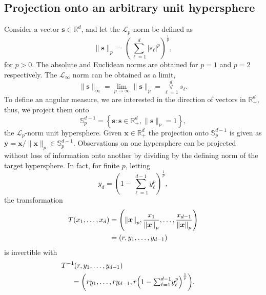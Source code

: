\subsection{Projection onto an arbitrary unit hypersphere\label{subsec:projection}}

Consider a vector $\bm{s} \in {\mathbb R}^d$, and let the $\mathcal{L}_p$-norm be defined as
  \begin{equation*}
    \lVert \bm{s} \rVert_p = \left({\textstyle\sum}_{\ell = 1}^d \lvert s_{\ell}\rvert^p\right)^{\frac{1}{p}},
  \end{equation*}
for $p>0$. The absolute and Euclidean norms are obtained for $p=1$ and $p=2$ respectively. 
The $\mathcal{L}_{\infty}$ norm can be obtained as a limit, 
  \begin{equation*}
    \lVert \bm{s} \rVert_{\infty}
      = \lim\limits_{p\to\infty} \lVert \bm{s} \rVert_p
      = \underset{\ell = 1}{\overset{d}{\vee}}s_{\ell}.
  \end{equation*}
To define an angular measure,  we are interested in the direction of
vectors in ${\mathbb R}_{+}^d$, thus, we project them onto
  \begin{equation*}
    {\mathbb S}_{p}^{d-1} = \left\lbrace \bm{s} : \bm{s} \in {\mathbb R}_{+}^{d}, \lVert \bm{s}\rVert_{p} = 1\right\rbrace,
  \end{equation*}
  the $\mathcal{L}_p$-norm unit hypersphere.
  Given $\bm{x}\in {\mathbb R}^d_+$ the projection onto ${\mathbb S}_{p}^{d-1}$ is given as
  $\bm{y} = \bm{x} / \lVert \bm{x}\rVert_p \in {\mathbb S}_{p}^{d-1}$.
  Observations on one hypersphere can be projected without loss of information onto another by
  dividing by the defining norm of the target hypersphere. In fact, for finite $p$, letting 
  \begin{equation*}
    y_d = \left(1 - {\textstyle\sum}_{\ell = 1}^{d-1}y_{\ell}^p\right)^{\frac{1}{p}},
  \end{equation*}
  the transformation
  \begin{equation}
    \label{eqn:pnormt}
    \begin{aligned}
    T(x_1,\ldots,x_d) &= \left(\pnorm{\bm{x}}{p}, \frac{x_1}{\pnorm{\bm{x}}{p}},
                          \ldots , \frac{x_{d-1}}{\pnorm{\bm{x}}{p}}\right) \\
                        &= (r,y_1,\ldots,y_{d-1})
    \end{aligned}
  \end{equation}
  is invertible with
  \begin{equation}
    \label{eqn:pnormtinv}
    \begin{aligned}
    &\hspace{-0.5cm}T^{-1}\left(r,y_1,\ldots,y_{d-1}\right)\\
      & = \left(ry_1,\ldots,ry_{d-1}, r\left(1 - {\textstyle\sum}_{\ell = 1}^{d-1}y_{\ell}^p\right)^{\frac{1}{p}}\right).
    \end{aligned}
  \end{equation}
